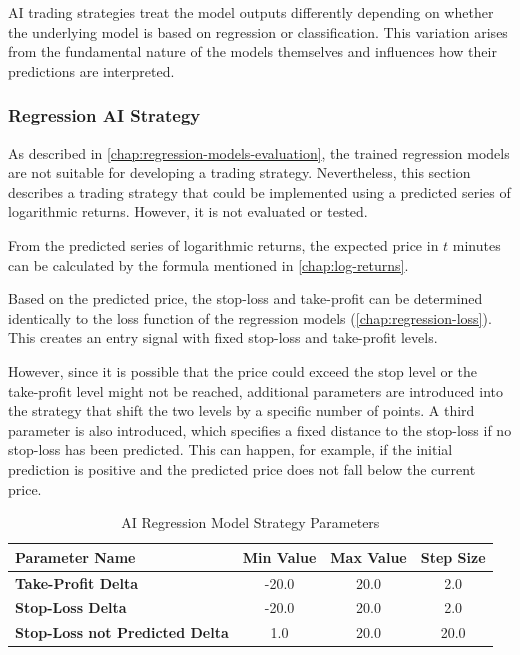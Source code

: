 AI trading strategies treat the model outputs differently depending on whether the underlying model is based on regression or classification.
This variation arises from the fundamental nature of the models themselves and influences how their predictions are interpreted.

\subsubsection{Regression AI Strategy}
\label{chap:regression-ai-stategy}

As described in \autoref{chap:regression-models-evaluation}, the trained regression models are not suitable for developing a trading strategy.
Nevertheless, this section describes a trading strategy that could be implemented using a predicted series of logarithmic returns.
However, it is not evaluated or tested.

From the predicted series of logarithmic returns, the expected price in $t$ minutes can be calculated by the formula mentioned in \autoref{chap:log-returns}.

Based on the predicted price, the stop-loss and take-profit can be determined identically to the loss function of the regression models (\autoref{chap:regression-loss}).
This creates an entry signal with fixed stop-loss and take-profit levels.

However, since it is possible that the price could exceed the stop level or the take-profit level might not be reached, additional parameters are introduced into the strategy that shift the two levels by a specific number of points.
A third parameter is also introduced, which specifies a fixed distance to the stop-loss if no stop-loss has been predicted.
This can happen, for example, if the initial prediction is positive and the predicted price does not fall below the current price.

\begin{table}[H]
    \centering
    \begin{tabular}{L{4cm}ccc}
        \toprule
        \textbf{Parameter Name} & Min Value & Max Value & Step Size
        \\
        \midrule
        \textbf{Take-Profit Delta}             & -20.0 & 20.0 & 2.0  \\
        \textbf{Stop-Loss Delta}               & -20.0 & 20.0 & 2.0  \\
        \textbf{Stop-Loss not Predicted Delta} & 1.0   & 20.0 & 20.0 \\
        \bottomrule
    \end{tabular}
    \caption{AI Regression Model Strategy Parameters}
    \label{tbl:regression-strategy-parameters}
\end{table}

